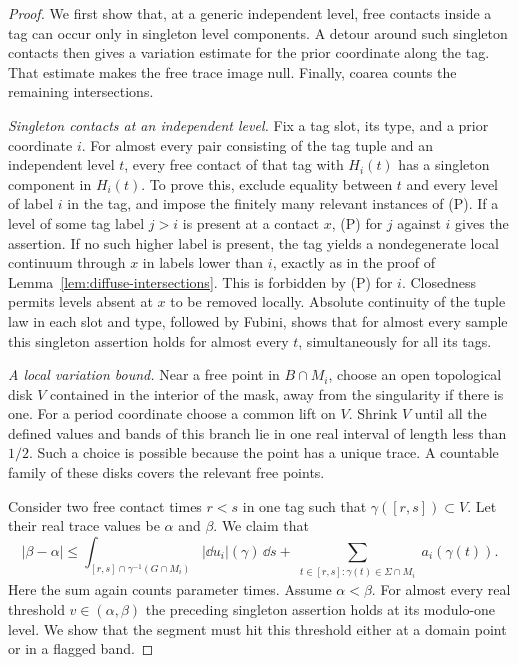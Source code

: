 \begin{proof}
We first show that, at a generic independent level, free contacts inside
a tag can occur only in singleton level components.  A detour around
such singleton contacts then gives a variation estimate for the prior
coordinate along the tag.  That estimate makes the free trace image
null.  Finally, coarea counts the remaining intersections.

\emph{Singleton contacts at an independent level.}
Fix a tag slot, its type, and a prior coordinate $i$.  For almost every
pair consisting of the tag tuple and an independent level $t$, every
free contact of that tag with $H_i(t)$ has a singleton component in
$H_i(t)$.  To prove this, exclude equality between $t$ and every level
of label $i$ in the tag, and impose the finitely many relevant
instances of \textup{(P)}.  If a level of some tag label $j>i$ is present
at a contact $x$, \textup{(P)} for $j$ against $i$ gives the assertion.
If no such higher label is present, the tag yields a nondegenerate
local continuum through $x$ in labels lower than $i$, exactly as in
the proof of Lemma~\ref{lem:diffuse-intersections}.  This is forbidden
by \textup{(P)} for $i$.  Closedness permits levels absent at $x$ to
be removed locally.  Absolute continuity of the tuple law in each slot
and type, followed by Fubini, shows that for almost every sample this singleton
assertion holds for almost every $t$, simultaneously for all its tags.

\emph{A local variation bound.}
Near a free point in $B\cap M_i$, choose an open topological disk
$V$ contained in the interior of the mask, away from the singularity
if there is one.  For a period coordinate choose a common lift on
$V$.  Shrink $V$ until all the defined values and bands of this
branch lie in one real interval of length less than $1/2$.  Such a
choice is possible because the point has a unique trace.  A countable
family of these disks covers the relevant free points.

Consider two free contact times $r<s$ in one tag such that
$\gamma([r,s])\subset V$.  Let their real trace values be $\alpha$
and $\beta$.  We claim that
\begin{equation}
 \label{eq:tag-trace-variation}
 |\beta-\alpha|\le
 \int_{[r,s]\cap\gamma^{-1}(G\cap M_i)}|\dd u_i|(\gamma)\,\dd s
 +\sum_{\substack{t\in[r,s]\colon\gamma(t)\in\Sigma\cap M_i}}
      a_i(\gamma(t)).
\end{equation}
Here the sum again counts parameter times.  Assume $\alpha<\beta$.
For almost every real threshold $v\in(\alpha,\beta)$ the preceding
singleton assertion holds at its modulo-one level.  We show that the
segment must hit this threshold either at a domain point or in a
flagged band.


\end{proof}
